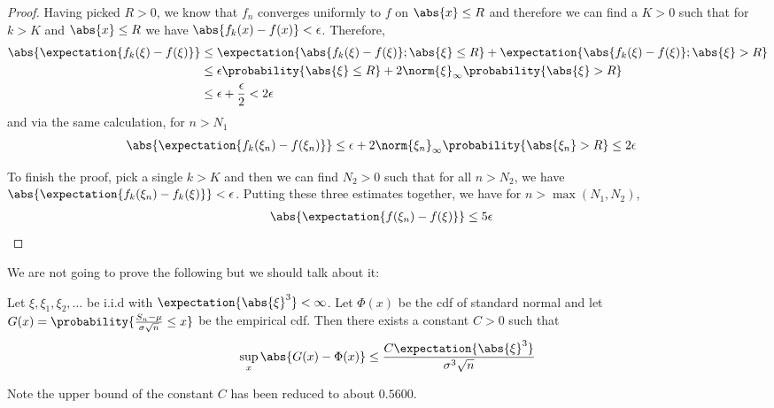\begin{proof}
Having picked $R>0$, we know that $f_n$ converges uniformly to $f$ on
$\abs{x} \leq R$ and therefore we can find a $K > 0$ such that for $k
> K$ and $\abs{x} \leq R$  we have $\abs{f_k(x) - f(x)} < \epsilon$.
Therefore,
\begin{align*}
\abs{\expectation{f_k(\xi) - f(\xi)}} &\leq \expectation{\abs{f_k(\xi)
    - f(\xi)} ; \abs{\xi} \leq R} + \expectation{\abs{f_k(\xi)
    - f(\xi)} ; \abs{\xi} > R} \\
&\leq \epsilon \probability{ \abs{\xi} \leq R} + 2\norm{\xi}_\infty \probability{ \abs{\xi} > R} \\
&\leq \epsilon + \frac{\epsilon}{2} < 2\epsilon
\end{align*}
and via the same calculation, for $n > N_1$
\begin{align*}
\abs{\expectation{f_k(\xi_n) - f(\xi_n)}} &\leq \epsilon + 2\norm{\xi_n}_\infty \probability{ \abs{\xi_n} > R} \leq 2\epsilon
\end{align*}

To finish the proof, pick a single $k > K$ and then we can find $N_2 >
0$ such that for all $n > N_2$, we have $\abs{\expectation{f_k(\xi_n)
    - f_k(\xi)}} < \epsilon$.  Putting these three estimates together,
we have for $n > \max(N_1, N_2)$, 
\begin{align*}
\abs{\expectation{f(\xi_n) - f(\xi)}} &\leq 5 \epsilon
\end{align*}
\end{proof}

We are not going to prove the following but we should talk about it:
\begin{thm}\label{Berry-Esseen Theorem}Let $\xi, \xi_1, \xi_2, \dots$
  be i.i.d with $\expectation{\abs{\xi}^3} < \infty$.  Let $\Phi(x)$
  be the cdf of standard normal and let $G(x) = \probability{\frac{S_n
      - \mu}{\sigma\sqrt{n}} \leq x}$ be the empirical cdf.  Then
  there exists a constant $C > 0$ such that
\begin{align*}
\sup_x \abs{G(x) - \Phi(x)} \leq \frac{C
  \expectation{\abs{\xi}^3}}{\sigma^3 \sqrt{n}}
\end{align*}
\end{thm}
Note the upper bound of the constant $C$ has been reduced to about
$0.5600$.  
